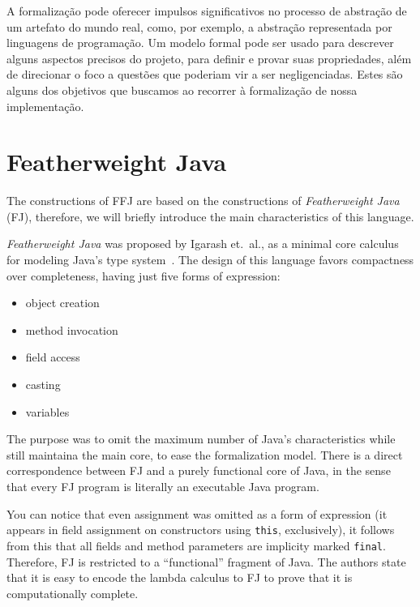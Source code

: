 A formalização pode oferecer impulsos significativos no processo de abstração de
um artefato do mundo real, como, por exemplo, a abstração representada por
linguagens de programação.  Um modelo formal pode ser usado para descrever
alguns aspectos precisos do projeto, para definir e provar suas propriedades,
além de direcionar o foco a questões que poderiam vir a ser negligenciadas.
Estes são alguns dos objetivos que buscamos ao recorrer à formalização de nossa
implementação.

\section{Featherweight Java}

The constructions of FFJ are based on the constructions of \textit{Featherweight
Java} (FJ), therefore, we will briefly introduce the main characteristics of
this language.

\textit{Featherweight Java} was proposed by Igarash et.\ al., as a minimal core
calculus for modeling Java's type system~\cite{Igarashi99featherweightjava}. The 
design of this language favors compactness over completeness, having just five 
forms of expression:
\begin{itemize}
    \item object creation
    \item method invocation
    \item field access
    \item casting 
    \item variables
\end{itemize}

The purpose was to omit the maximum number of Java's characteristics while still
maintaina the main core, to ease the formalization model.
There is a direct correspondence between FJ and a purely functional core of
Java, in the sense that every FJ program is literally an executable Java
program.

You can notice that even assignment was omitted as a form of expression (it
appears in field assignment on constructors using \texttt{this}, exclusively), it
follows from this that all fields and method parameters are implicity marked
\texttt{final}. Therefore, FJ is restricted to a ``functional'' fragment of
Java. The authors state that it is easy to encode the lambda calculus to FJ to
prove that it is computationally complete.

